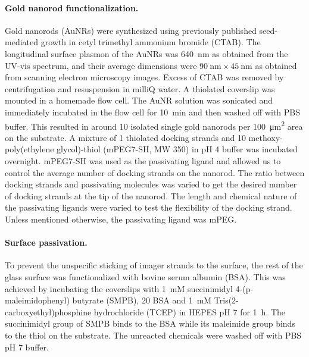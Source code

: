 \paragraph*{Gold nanorod functionalization.} Gold nanorods (AuNRs) were synthesized using previously published seed-mediated growth in cetyl trimethyl ammonium bromide (CTAB). \cite{nikoobakht2003preparation}
The longitudinal surface plasmon of the AuNRs was \SI{640}{\nm} as obtained from the UV-vis spectrum, and their average dimensions were $\SI{90}{\nm}\times\SI{45}{\nm}$ as obtained from scanning electron microscopy images.
Excess of CTAB was removed by centrifugation and resuspension in milliQ water.
A thiolated coverslip was mounted in a homemade flow cell.
The AuNR solution was sonicated and immediately incubated in the flow cell for 10~min and then washed off with PBS buffer.
This resulted in around 10 isolated single gold nanorods per \SI{100}{\um\squared} area on the substrate.
A mixture of \SI{1}{\nM} thiolated docking strands and \SI{10}{\uM} methoxy-poly(ethylene glycol)-thiol (mPEG7-SH, MW 350) in pH 4 buffer was incubated overnight.
mPEG7-SH was used as the passivating ligand and allowed us to control the average number of docking strands on the nanorod.
The ratio between docking strands and passivating molecules was varied to get the desired number of docking strands at the tip of the nanorod.
The length and chemical nature of the passivating ligands were varied to test the flexibility of the docking strand.
Unless mentioned otherwise, the passivating ligand was mPEG.


\paragraph*{Surface passivation.} To prevent the unspecific sticking of imager strands to the surface, the rest of the glass surface was functionalized with bovine serum albumin (BSA).
This was achieved by incubating the coverslips with \SI{1}{mM} succinimidyl 4-(p-maleimidophenyl) butyrate (SMPB), \SI{20}{\uM} BSA and \SI{1}{mM} Tris(2-carboxyethyl)phosphine hydrochloride (TCEP) in HEPES pH 7 for \SI{1}{\hour}.
The succinimidyl group of SMPB binds to the BSA while its maleimide group binds to the thiol on the substrate. 
The unreacted chemicals were washed off with PBS pH 7 buffer.


